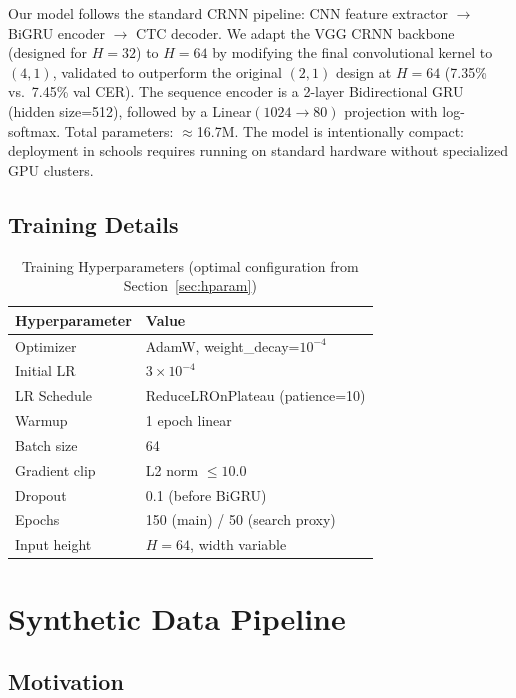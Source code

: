 \documentclass[conference]{IEEEtran}
\begin{document}
Our model follows the standard CRNN pipeline: CNN feature extractor $\to$ BiGRU encoder $\to$ CTC decoder. We adapt the VGG CRNN backbone (designed for $H=32$) to $H=64$ by modifying the final convolutional kernel to $(4,1)$, validated to outperform the original $(2,1)$ design at $H=64$ (7.35\% vs.\ 7.45\% val CER). The sequence encoder is a 2-layer Bidirectional GRU (hidden size=512), followed by a Linear$(1024\!\to\!80)$ projection with log-softmax. Total parameters: $\approx$16.7M. The model is intentionally compact: deployment in schools requires running on standard hardware without specialized GPU clusters.

\subsection{Training Details}

\begin{table}[h]
\centering
\caption{Training Hyperparameters (optimal configuration from Section~\ref{sec:hparam})}
\label{tab:hparams}
\begin{tabular}{@{}ll@{}}
\toprule
\textbf{Hyperparameter} & \textbf{Value} \\
\midrule
Optimizer       & AdamW, weight\_decay=$10^{-4}$ \\
Initial LR      & $3\times10^{-4}$ \\
LR Schedule     & ReduceLROnPlateau (patience=10) \\
Warmup          & 1 epoch linear \\
Batch size      & 64 \\
Gradient clip   & L2 norm $\leq 10.0$ \\
Dropout         & 0.1 (before BiGRU) \\
Epochs          & 150 (main) / 50 (search proxy) \\
Input height    & $H=64$, width variable \\
\bottomrule
\end{tabular}
\end{table}

\section{Synthetic Data Pipeline}

\subsection{Motivation}
\end{document}
